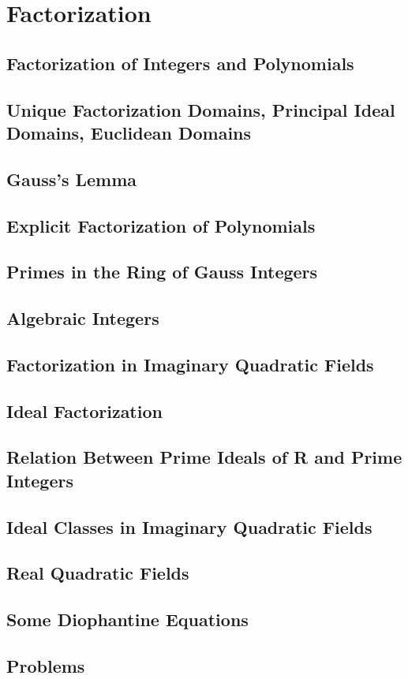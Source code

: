 \chapter{Factorization}
\section{Factorization of Integers and Polynomials}
\section{Unique Factorization Domains, Principal Ideal Domains, Euclidean Domains}
\section{Gauss's Lemma}
\section{Explicit Factorization of Polynomials}
\section{Primes in the Ring of Gauss Integers}
\section{Algebraic Integers}
\section{Factorization in Imaginary Quadratic Fields}
\section{Ideal Factorization}
\section{Relation Between Prime Ideals of R and Prime Integers}
\section{Ideal Classes in Imaginary Quadratic Fields}
\section{Real Quadratic Fields}
\section{Some Diophantine Equations}
\section{Problems}
